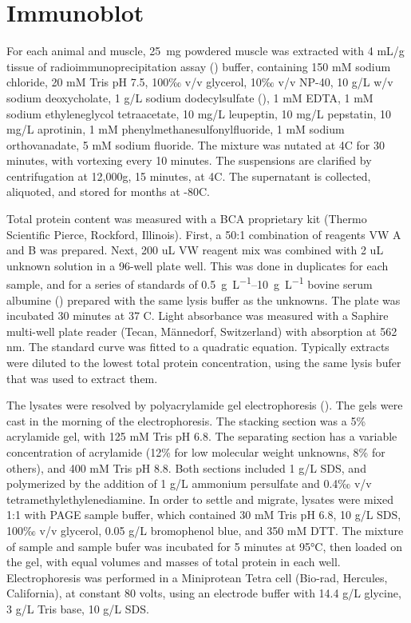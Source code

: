 \documentclass[12pt,english]{report}\usepackage[]{graphicx}\usepackage[]{color}
\begin{document}
\section{Immunoblot}

For each animal and muscle, \SI{25}{\milli\gram} powdered muscle
was extracted with 4 mL/g tissue of radioimmunoprecipitation assay
() buffer, containing
150 mM sodium chloride, 20 mM Tris pH 7.5, 100‰ v/v glycerol, 10‰
v/v NP-40, 10 g/L w/v sodium deoxycholate, 1 g/L sodium dodecylsulfate
(), 1 mM EDTA, 1 mM sodium
ethyleneglycol tetraacetate, 10 mg/L leupeptin, 10 mg/L pepstatin,
10 mg/L aprotinin, 1 mM phenylmethanesulfonylfluoride, 1 mM sodium
orthovanadate, 5 mM sodium fluoride. The mixture was nutated at 4C
for 30 minutes, with vortexing every 10 minutes. The suspensions are
clarified by centrifugation at 12,000g, 15 minutes, at 4C. The supernatant
is collected, aliquoted, and stored for months at -80C.

Total protein content was measured with a BCA proprietary kit (Thermo
Scientific Pierce, Rockford, Illinois). First, a 50:1 combination
of reagents VW A and B was prepared. Next, 200 uL VW reagent mix was
combined with 2 uL unknown solution in a 96-well plate well. This
was done in duplicates for each sample, and for a series of standards
of \SIrange{.5}{10}{\gram\per\liter} bovine serum albumine ()
prepared with the same lysis buffer as the unknowns. The plate was
incubated 30 minutes at 37 C. Light absorbance was measured with a
Saphire multi-well plate reader (Tecan, Männedorf, Switzerland) with
absorption at 562 nm. The standard curve was fitted to a quadratic
equation. Typically extracts were diluted to the lowest total protein
concentration, using the same lysis bufer that was used to extract
them.

The lysates were resolved by polyacrylamide gel electrophoresis ().
The gels were cast in the morning of the electrophoresis. The stacking
section was a 5\% acrylamide gel, with 125 mM Tris pH 6.8. The separating
section has a variable concentration of acrylamide (12\% for low molecular
weight unknowns, 8\% for others), and 400 mM Tris pH 8.8. Both sections
included 1 g/L SDS, and polymerized by the addition of 1 g/L ammonium
persulfate and 0.4‰ v/v tetramethylethylenediamine. In order to settle
and migrate, lysates were mixed 1:1 with PAGE sample buffer, which
contained 30 mM Tris pH 6.8, 10 g/L SDS, 100‰ v/v glycerol, 0.05 g/L
bromophenol blue, and 350 mM DTT. The mixture of sample and sample
bufer was incubated for 5 minutes at 95°C, then loaded on the gel,
with equal volumes and masses of total protein in each well. Electrophoresis
was performed in a Miniprotean Tetra cell (Bio-rad, Hercules, California),
at constant 80 volts, using an electrode buffer with 14.4 g/L glycine,
3 g/L Tris base, 10 g/L SDS.
\end{document}
